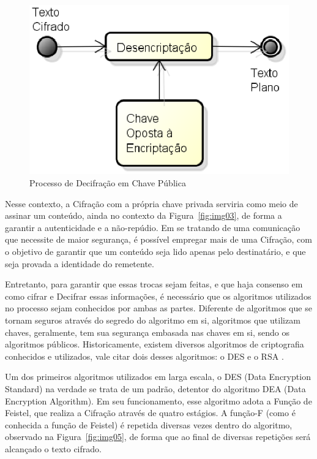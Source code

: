 	\begin{figure}[!ht]
		\centering
		\includegraphics[keepaspectratio=true,scale=0.5]{figuras/desencript.eps}
		\caption{Processo de Decifração em Chave Pública}
		\label{fig:img04}
	\end{figure}

	Nesse contexto, a Cifração com a própria chave privada serviria como meio de assinar um conteúdo, ainda no contexto da Figura~\ref{fig:img03}, de forma a garantir a autenticidade e a não-repúdio. Em se tratando de uma comunicação que  necessite de maior segurança, é possível empregar mais de uma Cifração, com o objetivo de garantir que um conteúdo seja lido apenas pelo destinatário, e que seja provada a identidade do remetente.
	
	Entretanto, para garantir  que essas trocas sejam feitas, e que haja consenso em como cifrar e Decifrar essas informações, é necessário que os algoritmos utilizados no processo sejam conhecidos por ambas as partes. Diferente de algoritmos que se tornam seguros através do segredo do algoritmo em si, algoritmos que utilizam chaves, geralmente, tem sua segurança embasada nas chaves em si, sendo os algoritmos públicos. Historicamente, existem diversos algoritmos de criptografia conhecidos e utilizados, vale citar dois desses algoritmos: o DES e o RSA \cite{stallings11}.
	
	Um dos primeiros algoritmos utilizados em larga escala, o DES (Data Encryption Standard) na verdade se trata de um padrão, detentor do algoritmo DEA (Data Encryption Algorithm). Em seu funcionamento, esse algoritmo adota a Função de Feistel, que realiza a Cifração através de quatro estágios. A função-F (como é conhecida a função de Feistel) é repetida diversas vezes dentro do algoritmo, observado na Figura~\ref{fig:img05}, de forma que ao final de diversas repetições será alcançado o texto cifrado.
	
